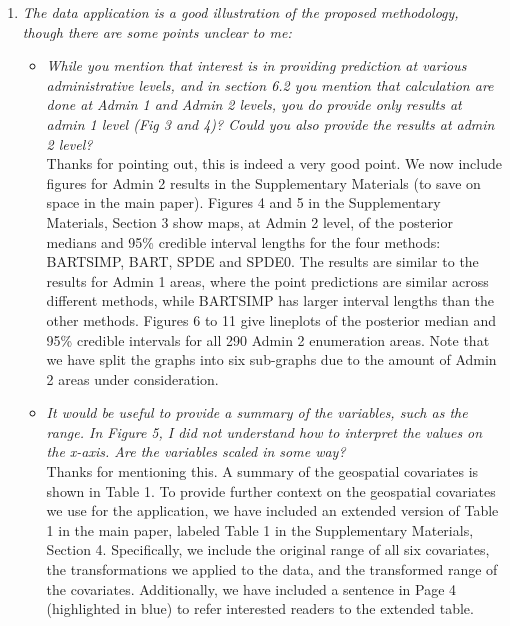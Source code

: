 \documentclass[12pt]{article}
\begin{document}
\begin{enumerate}
    \item {\it The data application is a good illustration of the proposed methodology, though there are some points unclear to me:}
\begin{itemize}
    \item {\it While you mention that interest is in providing prediction at various administrative levels, and in section 6.2 you mention that calculation are done at Admin 1 and Admin 2 levels, you do provide only results at admin 1 level (Fig 3 and 4)? Could you also provide the results at admin 2 level?}\\

    {\color{darkblue} Thanks for pointing out, this is indeed a very good point. We now include figures for Admin 2 results in the Supplementary Materials (to save on space in the main paper). Figures 4 and 5 in the Supplementary Materials, Section 3 show maps, at Admin 2 level, of the posterior medians and 95\% credible interval lengths for the four methods: BARTSIMP, BART, SPDE and SPDE0. The results are similar to the results for Admin 1 areas, where the point predictions are similar across different methods, while BARTSIMP has larger  interval lengths than the other methods. Figures 6 to 11 give lineplots of the posterior median and 95\% credible intervals for all 290 Admin 2 enumeration areas. Note that we have split the graphs into six sub-graphs due to the amount of Admin 2 areas under consideration.} \\

    
    \item {\it It would be useful to provide a summary of the variables, such as the range. In Figure 5, I did not understand how to interpret the values on the x-axis. Are the variables scaled in some way?}\\

    {\color{darkblue} Thanks for mentioning this. A summary of the geospatial covariates is shown in Table 1. To provide further context on the geospatial covariates we use for the application, we have included an extended version of Table 1 in the main paper, labeled Table 1 in the Supplementary Materials, Section 4. Specifically, we include the original range of all six covariates, the transformations we applied to the data, and the transformed range of the covariates. Additionally, we have included a sentence in Page 4 (highlighted in blue) to refer interested readers to the extended table.}\\


\end{itemize}
\end{enumerate}
\end{document}
